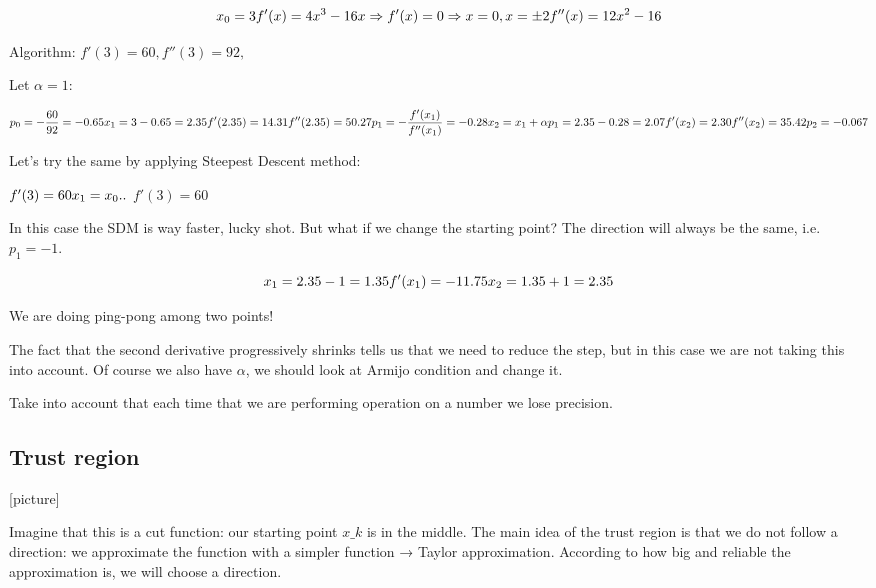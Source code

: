 $$
x_0=3 \\ f'(x) = 4x^3-16x \Rightarrow f'(x)=0 \Rightarrow  x=0, x=\pm 2\\ f''(x)=12x^2-16
$$

Algorithm: $f'(3)=60, f''(3)=92,$

Let $\alpha=1$:

$$
p_0= -\frac{60}{92}=-0.65 \\ x_1=3-0.65=2.35 \\ f'(2.35) = 14.31\\ f''(2.35) = 50.27 \\ p_1=-\frac{f'(x_1)}{f''(x_1)} = -0.28\\ x_2=x_1+\alpha p_1 = 2.35-0.28=2.07 \\ f'(x_2) = 2.30 \\ f''(x_2)=35.42\\ p_2 = -0.067
$$

Let's try the same by applying Steepest Descent method:

$f'(3)=60 \\ x_1 = x_0..$
$f'(3)=60$

In this case the SDM is way faster, lucky shot. But what if we change
the starting point? The direction will always be the same,
i.e.~$p_1 = -1$.

$$
x_1=2.35-1=1.35\\f'(x_1)=-11.75\\x_2=1.35+1 = 2.35 
$$

We are doing ping-pong among two points!

The fact that the second derivative progressively shrinks tells us that
we need to reduce the step, but in this case we are not taking this into
account. Of course we also have $\alpha$, we should look at Armijo
condition and change it.

Take into account that each time that we are performing operation on a
number we lose precision.

\hypertarget{trust-region}{%
\subsection{Trust region}\label{trust-region}}

{[}picture{]}

Imagine that this is a cut function: our starting point $x\_k$ is in the
middle. The main idea of the trust region is that we do not follow a
direction: we approximate the function with a simpler function → Taylor
approximation. According to how big and reliable the approximation is,
we will choose a direction.

